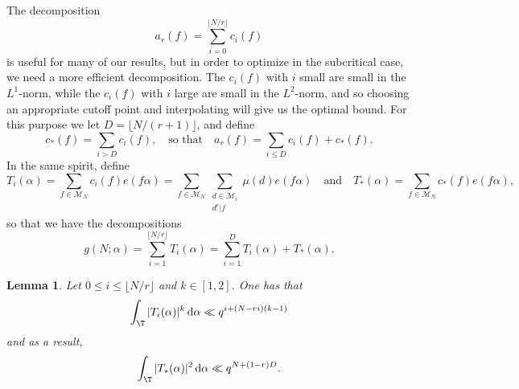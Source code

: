 \documentclass[reqno,11pt]{amsart}
\newtheorem{lemma}[theorem]{Lemma}
\theoremstyle{definition}
\theoremstyle{remark}
\numberwithin{equation}{section}
\def\calM{{\mathcal M}}
\renewcommand{\d}{\,{\rm d}} %
\newcommand{\<}{\begin{equation}}
\renewcommand{\>}{\end{equation}}
\begin{document}
The decomposition
\[a_r(f) = \sum_{i=0}^{\lfloor N/r \rfloor} c_i(f)\]
is useful for many of our results, but in order to optimize in the subcritical case, we need a more efficient decomposition. The $c_i(f)$ with $i$ small are small in the $L^1$-norm, while the $c_i(f)$ with $i$ large are small in the $L^2$-norm, and so choosing an appropriate cutoff point and interpolating will give us the optimal bound. For this purpose we let $D = \lfloor N/(r+1)\rfloor$, and define
\<
c_*(f) = \sum_{i>D} c_i(f), \quad \text{so that} \quad a_r(f) = \sum_{i\leq D} c_i(f) + c_*(f).
\>
In the same spirit, define
\[T_i(\alpha) = \sum_{f \in \calM_N} c_i(f)e(f\alpha) = \sum_{f \in \calM_N}\sum_{\substack{d \in \calM_i \\ d^r | f}} \mu(d)e(f\alpha)
\quad\text{and}\quad
T_*(\alpha) = \sum_{f \in \calM_N} c_*(f)e(f\alpha),\]
so that we have the decompositions
\<\label{T_*}
g(N;\alpha) = \sum_{i=1}^{\lfloor N/r \rfloor} T_i(\alpha) = \sum_{i=1}^{D} T_i(\alpha) + T_*(\alpha).
\>
\begin{lemma}\label{T_i}
    Let $0 \leq i \leq \lfloor N/r \rfloor$ and $k \in [1,2]$. One has that
    \[\int_\T |T_i(\alpha)|^k \d\alpha \ll q^{i+(N-ri)(k-1)}\]
    and as a result,
    \[\int_\T |T_*(\alpha)|^2 \d\alpha \ll q^{N+(1-r)D}.\]
\end{lemma}
\end{document}
